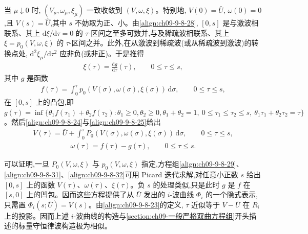 \documentclass[../../main.tex]{subfiles}
\begin{document}
当 $\mu\downarrow0$ 时, $(V_{\mu},\omega_{\mu},\xi_{\mu})$ 一致收敛到 $(V,\omega,\xi)$。特别地, $V(0)=\bar{U}$, $\omega(0)=0$,且 $V(s)=\hat{U}$,其中 $s$ 不妨取为正、小。由\eqref{align:ch09-9-8-28}, $[0,s]$ 是与激波相联系、其上 $\mathrm{d}\xi/\mathrm{d}\tau=0$ 的 $\tau$-区间之至多可数并,与及稀疏波相联系、其上 $\xi=p_{0}(V,\omega,\xi)$ 的 $\tau$-区间之并。此外,在从激波到稀疏波(或从稀疏波到激波)的转换点处, $\mathrm{d}^{2}\xi_{\mu}/\mathrm{d}\tau^{2}$ 应非负(或非正)。于是推得
\begin{align}
\xi(\tau)=\frac{\mathrm{d}g}{\mathrm{d}\tau}(\tau),\qquad 0\leqslant\tau\leqslant s,
\label{align:ch09-9-8-29}
\end{align}
其中 $g$ 是函数
\begin{align}
f(\tau)=\int_{0}^{\tau}p_{0}(V(\sigma),\omega(\sigma),\xi(\sigma))\,\mathrm{d}\sigma,\qquad 0\leqslant\tau\leqslant s,
\label{align:ch09-9-8-30}
\end{align}
在 $[0,s]$ 上的凸包,即 $g(\tau)=\inf\{\theta_{1}f(\tau_{1})+\theta_{2}f(\tau_{2}):\theta_{1}\geqslant0,\theta_{2}\geqslant0,\theta_{1}+\theta_{2}=1,\ 0\leqslant\tau_{1}\leqslant\tau_{2}\leqslant s,\ \theta_{1}\tau_{1}+\theta_{2}\tau_{2}=\tau\}$。然后\eqref{align:ch09-9-8-24}与\eqref{align:ch09-9-8-25}给出
\begin{align}
V(\tau)=\bar{U}+\int_{0}^{\tau}P_{0}(V(\sigma),\omega(\sigma),\xi(\sigma))\,\mathrm{d}\sigma,\qquad 0\leqslant\tau\leqslant s,
\label{align:ch09-9-8-31}
\end{align}
\begin{align}
\omega(\tau)=f(\tau)-g(\tau),\qquad 0\leqslant\tau\leqslant s.
\label{align:ch09-9-8-32}
\end{align}

可以证明,一旦 $P_{0}(V,\omega,\xi)$ 与 $p_{0}(V,\omega,\xi)$ 指定,方程组\eqref{align:ch09-9-8-29}、\eqref{align:ch09-9-8-31}、\eqref{align:ch09-9-8-32}可用 Picard 迭代求解,对任意小正数 $s$ 给出 $[0,s]$ 上的函数 $V(\tau)$、$\omega(\tau)$、$\xi(\tau)$。负 $s$ 的处理类似,只是此时 $g$ 是 $f$ 在 $[s,0]$ 上的凹包。因而这些方程提供了从 $\bar{U}$ 发出的 $i$-波曲线 $\Phi_{i}$ 的一个隐式表示,只需置 $\Phi_{i}(s;\bar{U})=V(s)$。由\eqref{align:ch09-9-8-23}的定义, $\tau$ 近似等于 $V-\bar{U}$ 在 $R_{i}$ 上的投影。因而上述 $i$-波曲线的构造与\cref{section:ch09-一般严格双曲方程组}开头描述的标量守恒律波构造极为相似。
\end{document}
